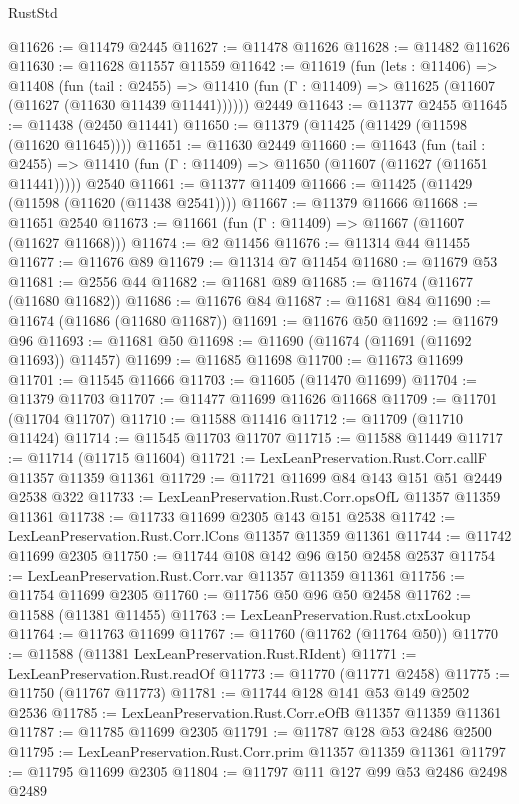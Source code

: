 \begin{lexlean}{RustStd}
\begin{coremodule}
@11626 := @11479 @2445
@11627 := @11478 @11626
@11628 := @11482 @11626
@11630 := @11628 @11557 @11559
@11642 := @11619
    (fun (lets : @11406) =>
    @11408
      (fun (tail : @2455) =>
      @11410 (fun (Γ : @11409) => @11625 (@11607 (@11627 (@11630 @11439 @11441))))))
    @2449
@11643 := @11377 @2455
@11645 := @11438 (@2450 @11441)
@11650 := @11379 (@11425 (@11429 (@11598 (@11620 @11645))))
@11651 := @11630 @2449
@11660 := @11643
    (fun (tail : @2455) => @11410 (fun (Γ : @11409) => @11650 (@11607 (@11627 (@11651 @11441)))))
    @2540
@11661 := @11377 @11409
@11666 := @11425 (@11429 (@11598 (@11620 (@11438 @2541))))
@11667 := @11379 @11666
@11668 := @11651 @2540
@11673 := @11661 (fun (Γ : @11409) => @11667 (@11607 (@11627 @11668)))
@11674 := @2 @11456
@11676 := @11314 @44 @11455
@11677 := @11676 @89
@11679 := @11314 @7 @11454
@11680 := @11679 @53
@11681 := @2556 @44
@11682 := @11681 @89
@11685 := @11674 (@11677 (@11680 @11682))
@11686 := @11676 @84
@11687 := @11681 @84
@11690 := @11674 (@11686 (@11680 @11687))
@11691 := @11676 @50
@11692 := @11679 @96
@11693 := @11681 @50
@11698 := @11690 (@11674 (@11691 (@11692 @11693)) @11457)
@11699 := @11685 @11698
@11700 := @11673 @11699
@11701 := @11545 @11666
@11703 := @11605 (@11470 @11699)
@11704 := @11379 @11703
@11707 := @11477 @11699 @11626 @11668
@11709 := @11701 (@11704 @11707)
@11710 := @11588 @11416
@11712 := @11709 (@11710 @11424)
@11714 := @11545 @11703 @11707
@11715 := @11588 @11449
@11717 := @11714 (@11715 @11604)
@11721 := LexLeanPreservation.Rust.Corr.callF @11357 @11359 @11361
@11729 := @11721 @11699 @84 @143 @151 @51 @2449 @2538 @322
@11733 := LexLeanPreservation.Rust.Corr.opsOfL @11357 @11359 @11361
@11738 := @11733 @11699 @2305 @143 @151 @2538
@11742 := LexLeanPreservation.Rust.Corr.lCons @11357 @11359 @11361
@11744 := @11742 @11699 @2305
@11750 := @11744 @108 @142 @96 @150 @2458 @2537
@11754 := LexLeanPreservation.Rust.Corr.var @11357 @11359 @11361
@11756 := @11754 @11699 @2305
@11760 := @11756 @50 @96 @50 @2458
@11762 := @11588 (@11381 @11455)
@11763 := LexLeanPreservation.Rust.ctxLookup
@11764 := @11763 @11699
@11767 := @11760 (@11762 (@11764 @50))
@11770 := @11588 (@11381 LexLeanPreservation.Rust.RIdent)
@11771 := LexLeanPreservation.Rust.readOf
@11773 := @11770 (@11771 @2458)
@11775 := @11750 (@11767 @11773)
@11781 := @11744 @128 @141 @53 @149 @2502 @2536
@11785 := LexLeanPreservation.Rust.Corr.eOfB @11357 @11359 @11361
@11787 := @11785 @11699 @2305
@11791 := @11787 @128 @53 @2486 @2500
@11795 := LexLeanPreservation.Rust.Corr.prim @11357 @11359 @11361
@11797 := @11795 @11699 @2305
@11804 := @11797 @111 @127 @99 @53 @2486 @2498 @2489

\end{coremodule}
\end{lexlean}
